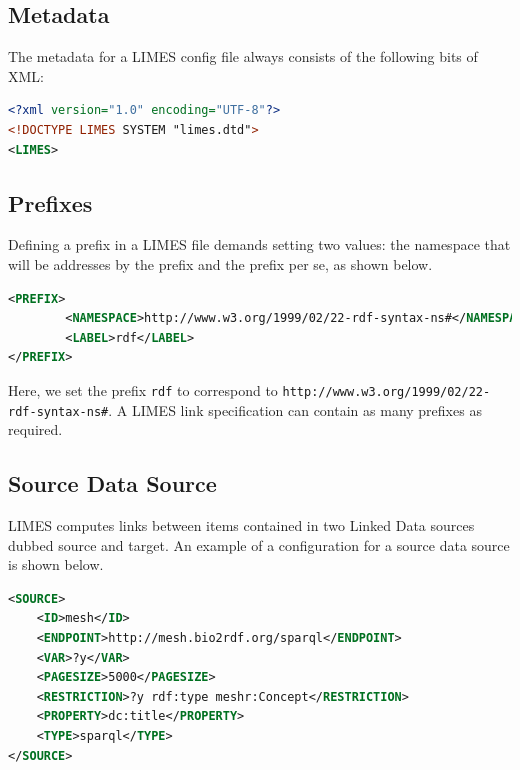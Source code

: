 \documentclass[a4paper, 11pt]{article}
\begin{document}
\subsection{Metadata}
The metadata for a LIMES config file always consists of the following bits of XML:

\begin{ttfamily}
\begin{lstlisting}[language=XML,basicstyle=\scriptsize,numberstyle=\tiny]
<?xml version="1.0" encoding="UTF-8"?>
<!DOCTYPE LIMES SYSTEM "limes.dtd">
<LIMES>
\end{lstlisting}
\end{ttfamily}

\subsection{Prefixes}
Defining a prefix in a LIMES file demands setting two values: the namespace that will be addresses by the prefix and the prefix per se, as shown below. 
\begin{ttfamily}
\begin{lstlisting}[language=XML,basicstyle=\scriptsize,numberstyle=\tiny]
<PREFIX>
		<NAMESPACE>http://www.w3.org/1999/02/22-rdf-syntax-ns#</NAMESPACE>
		<LABEL>rdf</LABEL>
</PREFIX>
\end{lstlisting}
\end{ttfamily}
Here, we set the prefix \texttt{rdf} to correspond to \texttt{http://www.w3.org/1999/02/22-rdf-syntax-ns\#}. A LIMES link specification can contain as many prefixes as required.

\subsection{Source Data Source}
LIMES computes links between items contained in two Linked Data sources dubbed source and target. An example of a configuration for a source data source is shown below.
\begin{ttfamily}
\begin{lstlisting}[language=XML,basicstyle=\scriptsize,numberstyle=\tiny]
<SOURCE>
	<ID>mesh</ID>
	<ENDPOINT>http://mesh.bio2rdf.org/sparql</ENDPOINT>
	<VAR>?y</VAR>
	<PAGESIZE>5000</PAGESIZE>
	<RESTRICTION>?y rdf:type meshr:Concept</RESTRICTION>
	<PROPERTY>dc:title</PROPERTY>
	<TYPE>sparql</TYPE>
</SOURCE>
\end{lstlisting}
\end{ttfamily}
\end{document}
